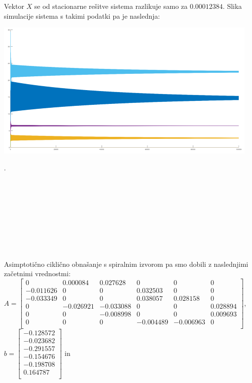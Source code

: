 \documentclass[a4paper, 12pt]{article}
\begin{document}
Vektor $ X $ se od stacionarne rešitve sistema razlikuje samo za $ 0.00012384 $. Slika simulacije
sistema s takimi podatki pa je naslednja:
\begin{center}
	\includegraphics{spiralni_lijak.png}
\end{center}
.
\\
\\
\\
\\
\\
\\
\\
\\
\\
\\
Asimptotično ciklično obnašanje s spiralnim izvorom pa smo dobili z naslednjimi
začetnimi vrednostmi:\\
$ A =
\begin{bmatrix}
	0 & 0.000084 & 0.027628 & 0 & 0 & 0 \\
	-0.011626 & 0 & 0 & 0.032503 & 0 & 0 \\
	-0.033349 & 0 & 0 & 0.038057 & 0.028158 & 0 \\
	0 & -0.026921 & -0.033088 & 0 & 0 & 0.028894 \\
	0 & 0 & -0.008998 & 0 & 0 & 0.009693 \\
	0 & 0 & 0 & -0.004489 & -0.006963 & 0 \\
\end{bmatrix} $, \\
$ b =
\begin{bmatrix}
	-0.128572 \\
	-0.023682 \\
	-0.291557 \\
	-0.154676 \\
	-0.198708 \\
	0.164787 \\
\end{bmatrix} $ in
\end{document}
